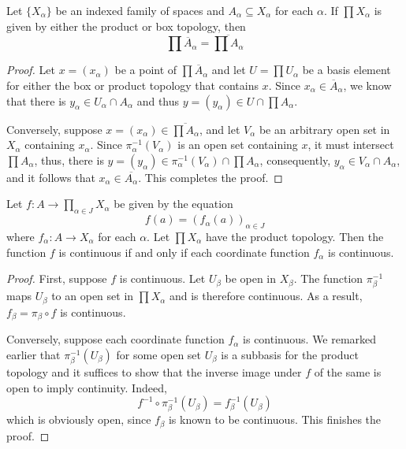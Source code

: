 \begin{theorem}
    Let $\{X_\alpha\}$ be an indexed family of spaces and $A_\alpha\subseteq X_\alpha$ for each $\alpha$. If $\prod X_\alpha$ is given by either the product or box topology, then 
    \begin{equation*}
        \prod\overline{A}_\alpha = \overline{\prod A_\alpha}
    \end{equation*}
\end{theorem}
\begin{proof}
    Let $x = (x_\alpha)$ be a point of $\prod\overline{A}_\alpha$ and let $U = \prod U_\alpha$ be a basis element for either the box or product topology that contains $x$. Since $x_\alpha\in\overline{A}_\alpha$, we know that there is $y_\alpha\in U_\alpha\cap A_\alpha$ and thus $y = (y_\alpha)\in U\cap\prod A_\alpha$.

    Conversely, suppose $x = (x_\alpha)\in\overline{\prod A_\alpha}$, and let $V_\alpha$ be an arbitrary open set in $X_\alpha$ containing $x_\alpha$. Since $\pi_\alpha^{-1}(V_\alpha)$ is an open set containing $x$, it must intersect $\prod A_\alpha$, thus, there is $y = (y_\alpha)\in\pi_\alpha^{-1}(V_\alpha)\cap\prod A_\alpha$, consequently, $y_\alpha\in V_\alpha\cap A_\alpha$, and it follows that $x_\alpha\in\overline{A_\alpha}$. This completes the proof.
\end{proof}

\begin{theorem}
    Let $f:A\to\prod_{\alpha\in J}X_\alpha$ be given by the equation 
    \begin{equation*}
        f(a) = (f_\alpha(a))_{\alpha\in J}
    \end{equation*}
    where $f_\alpha:A\to X_\alpha$ for each $\alpha$. Let $\prod X_\alpha$ have the product topology. Then the function $f$ is continuous if and only if each coordinate function $f_\alpha$ is continuous.
\end{theorem}
\begin{proof}
    First, suppose $f$ is continuous. Let $U_\beta$ be open in $X_\beta$. The function $\pi^{-1}_\beta$ maps $U_\beta$ to an open set in $\prod X_\alpha$ and is therefore continuous. As a result, $f_\beta = \pi_\beta\circ f$ is continuous.

    Conversely, suppose each coordinate function $f_\alpha$ is continuous. We remarked earlier that $\pi_\beta^{-1}(U_\beta)$ for some open set $U_\beta$ is a subbasis for the product topology and it suffices to show that the inverse image under $f$ of the same is open to imply continuity. Indeed, 
    \begin{equation*}
        f^{-1}\circ\pi^{-1}_\beta(U_\beta) = f_\beta^{-1}(U_\beta)
    \end{equation*}
    which is obviously open, since $f_\beta$ is known to be continuous. This finishes the proof.
\end{proof}

